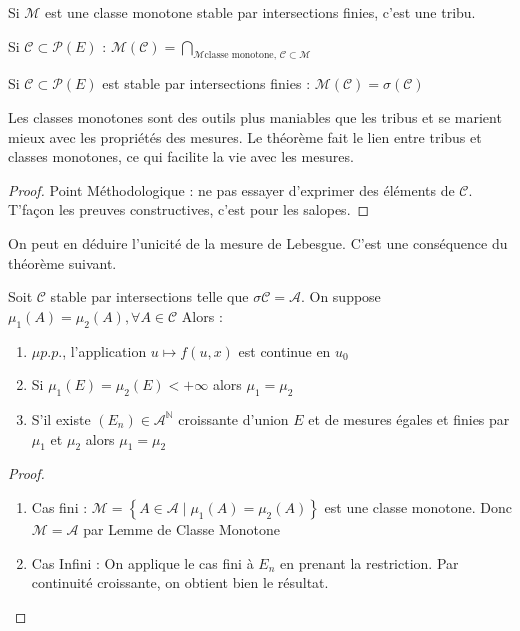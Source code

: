 \documentclass{cours}
\begin{document}
\begin{lemma}
    Si $\mathcal{M}$ est une classe monotone stable par intersections finies, c'est une tribu.
\end{lemma}
\begin{definition}
    Si $\mathcal{C} \subset \mathcal{P}(E)$ : $\mathcal{M}(\mathcal{C}) = \bigcap\limits_{\mathcal{M} \text{classe monotone, } \mathcal{C}\subset\mathcal{M}}$
\end{definition}
\begin{theorem}
    Si $\mathcal{C} \subset \mathcal{P}(E)$ est stable par intersections finies : $\mathcal{M}(\mathcal{C}) = \sigma{\left(\mathcal{C}\right)}$
\end{theorem}
\begin{remark}
    Les classes monotones sont des outils plus maniables que les tribus et se marient mieux avec les propriétés des mesures. Le théorème fait le lien entre tribus et classes monotones, ce qui facilite la vie avec les mesures.
\end{remark}
\begin{proof}
    Point Méthodologique : ne pas essayer d'exprimer des éléments de $\mathcal{C}$. T'façon les preuves constructives, c'est pour les salopes.
\end{proof}
\begin{remark}
    On peut en déduire l'unicité de la mesure de Lebesgue. C'est une conséquence du théorème suivant.
\end{remark}
\begin{theorem}
    Soit $\mathcal{C}$ stable par intersections telle que $\sigma{\mathcal{C}} = \mathcal{A}$.
    On suppose $\mu_{1}(A) = \mu_{2}(A), \forall A \in \mathcal{C}$
    Alors : \begin{enumerate}\item $\mu p.p.$, l'application $u \mapsto f(u, x)$ est continue en $u_{0}$
        \item Si $\mu_{1}(E) = \mu_{2}(E) < +\infty$ alors $\mu_{1} = \mu_{2}$
        \item S'il existe $(E_n) \in \mathcal{A}^{\mathbb{N}}$ croissante d'union $E$ et de mesures égales et finies par $\mu_{1}$ et $\mu_{2}$ alors $\mu_{1} = \mu_{2}$
    \end{enumerate}
\end{theorem}
\begin{proof}
    \begin{enumerate}
        \item Cas fini : $\mathcal{M} = \left\{A \in \mathcal{A} \mid \mu_{1}(A) = \mu_{2}(A)\right\}$ est une classe monotone. Donc $\mathcal{M} = \mathcal{A}$ par Lemme de Classe Monotone
        \item Cas Infini : On applique le cas fini à $E_{n}$ en prenant la restriction. Par continuité croissante, on obtient bien le résultat.
    \end{enumerate}
\end{proof}
\end{document}
